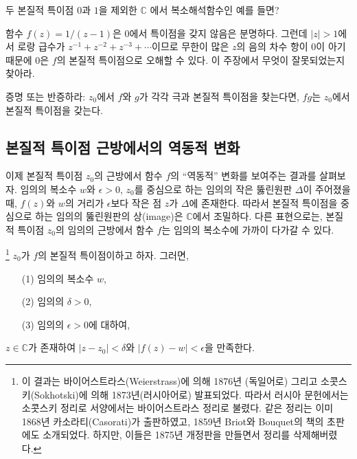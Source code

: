 \begin{salt_exercise}\label{ex-4-36}
두 본질적 특이점 $0$과 $1$을 제외한  $\mathbb C$ 에서
복소해석함수인 예를 들면?
\end{salt_exercise}

\begin{salt_exercise}\label{ex-4-37}
함수 $f(z) = 1/(z-1)$은 $0$에서 특이점을 갖지 않음은 분명하다.
그런데 $|z|>1$에서 로랑 급수가 $z^{-1} + z^{-2} + z^{-3} + \cdots$이므로
무한이 많은 $z$의 음의 차수 항이 $0$이 아기 때문에
$0$은 $f$의 본질적 특이점으로 오해할 수 있다. 
이 주장에서 무엇이 잘못되었는지 찾아라.
\end{salt_exercise}

\begin{salt_exercise}\label{ex-4-38}
증명 또는 반증하라:
$z_0$에서 $f$와 $g$가 각각 극과 본질적 특이점을 찾는다면,
$fg$는 $z_0$에서 본질적 특이점을 갖는다.
\end{salt_exercise}

\subsection{본질적 특이점 근방에서의 역동적 변화}

이제 본질적 특이점 $z_0$의 근방에서 함수 $f$의
``역동적'' 변화를 보여주는 결과를 살펴보자. 
임의의 복소수 $w$와 $\epsilon>0$, 
$z_0$를 중심으로 하는 임의의 작은 뚫린원판 $\Delta$이
주어졌을 때, 
$f(z)$와 $w$의 거리가 $\epsilon$보다 작은 점 $z$가
$\Delta$에 존재한다. 따라서
본질적 특이점을 중심으로 하는 임의의 뚫린원판의 상(image)은
$\mathbb C$에서 조밀하다.
다른 표현으로는, 본질적 특이점 $z_0$의 임의의 근방에서
함수 $f$는 임의의 복소수에 가까이 다가갈 수 있다.

\begin{salt_theorem} 
\footnote{
이 결과는 바이어스트라스(Weierstrass)에 의해
1876년 (독일어로) 그리고
소콧스키(Sokhotski)에 의해 1873년(러시아어로) 발표되었다.
따라서 러시아 문헌에서는 소콧스키 정리로
서양에서는 바이어스트라스 정리로 불렸다. 
같은 정리는 이미 1868년 카소라티(Casorati)가 출판하였고,
1859년 Briot와 Bouquet의 책의 초판에도 소개되었다.
하지만, 이들은 1875년 개정판을 만들면서 정리를 삭제해버렸다.
} \label{thm-4-10}
$z_0$가 $f$의 본질적 특이점이하고 하자. 그러면,
\begin{itemize}
\item[(1)] 임의의 복소수 $w$,
\item[(2)] 임의의 $\delta>0$,
\item[(3)] 임의의 $\epsilon>0$에 대하여,
\end{itemize}
$z\in\mathbb C$가 존재하여
$|z-z_0| <\delta$와 $|f(z) - w| < \epsilon$을 만족한다.
\end{salt_theorem}

